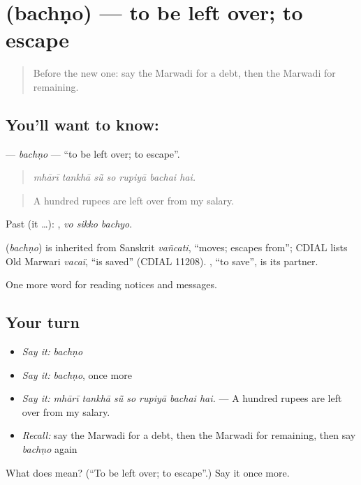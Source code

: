 \section[\texorpdfstring{\mw{बचणो} (bachṇo)}{बचणो (bachṇo)}]{ (bachṇo) — to be left over; to escape}

\label{lesson:MW-C195-bachno}



\begin{quote}
Before the new one: say the Marwadi for a debt, then the Marwadi for remaining.
\end{quote}

\subsection*{You'll want to know: }
\textbf{} — \emph{bachṇo} — \textquotedblleft{}to be left over; to escape\textquotedblright{}.

\begin{quote}
      
\end{quote}

\begin{quote}
\emph{mhārī tankhā sū̃ so rupiyā bachai hai.}
\end{quote}

\begin{quote}
A hundred rupees are left over from my salary.
\end{quote}

Past (it …):   , \emph{vo sikko bachyo}.

\begin{cousinweb}
\textbf{} (\emph{bachṇo}) is inherited from Sanskrit \emph{vañcati}, \textquotedblleft{}moves; escapes from\textquotedblright{}; CDIAL lists Old Marwari \emph{vacaï}, \textquotedblleft{}is saved\textquotedblright{} (CDIAL 11208). \textbf{}, \textquotedblleft{}to save\textquotedblright{}, is its partner.
\end{cousinweb}

\begin{grammarlens}[title={What you've built}]
One more word for reading notices and messages.
\end{grammarlens}

\subsection*{Your turn}
\begin{itemize}
\raggedright
  \item \emph{Say it:} \emph{bachṇo}
  \item \emph{Say it:} \emph{bachṇo}, once more
  \item \emph{Say it:} \emph{mhārī tankhā sū̃ so rupiyā bachai hai.} — A hundred rupees are left over from my salary.
  \item \emph{Recall:} say the Marwadi for a debt, then the Marwadi for remaining, then say \emph{bachṇo} again
\end{itemize}

\begin{tcolorbox}[breakable,colback=teal!4,colframe=teal!35!black,title={Before you move on}]
What does  mean? (\textquotedblleft{}To be left over; to escape\textquotedblright{}.) Say it once more.
\end{tcolorbox}

